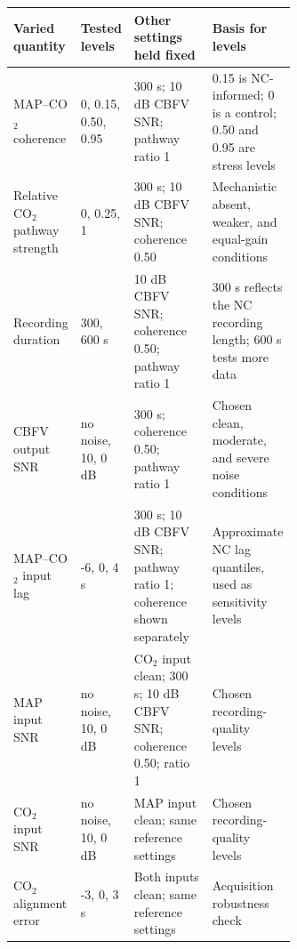 \begin{tabularx}{\linewidth}{@{}p{0.17\linewidth}p{0.17\linewidth}p{0.29\linewidth}X@{}}
\toprule
Varied quantity & Tested levels & Other settings held fixed & Basis for levels \\
\midrule
MAP--CO$_2$ coherence & 0, 0.15, 0.50, 0.95 & 300 s; 10 dB CBFV SNR; pathway ratio 1 & 0.15 is NC-informed; 0 is a control; 0.50 and 0.95 are stress levels \\
Relative CO$_2$ pathway strength & 0, 0.25, 1 & 300 s; 10 dB CBFV SNR; coherence 0.50 & Mechanistic absent, weaker, and equal-gain conditions \\
Recording duration & 300, 600 s & 10 dB CBFV SNR; coherence 0.50; pathway ratio 1 & 300 s reflects the NC recording length; 600 s tests more data \\
CBFV output SNR & no noise, 10, 0 dB & 300 s; coherence 0.50; pathway ratio 1 & Chosen clean, moderate, and severe noise conditions \\
MAP--CO$_2$ input lag & -6, 0, 4 s & 300 s; 10 dB CBFV SNR; pathway ratio 1; coherence shown separately & Approximate NC lag quantiles, used as sensitivity levels \\
MAP input SNR & no noise, 10, 0 dB & CO$_2$ input clean; 300 s; 10 dB CBFV SNR; coherence 0.50; ratio 1 & Chosen recording-quality levels \\
CO$_2$ input SNR & no noise, 10, 0 dB & MAP input clean; same reference settings & Chosen recording-quality levels \\
CO$_2$ alignment error & -3, 0, 3 s & Both inputs clean; same reference settings & Acquisition robustness check \\
\bottomrule
\end{tabularx}
